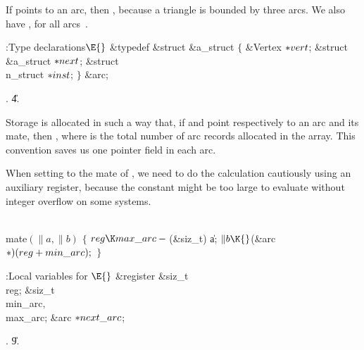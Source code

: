 \smallskip\noindent
If  points to an arc, then , because a triangle
is bounded by three arcs. We also have , for
all arcs~.

\Y\B\4:Type declarations\X${}\E{}$\6
\&{typedef} \&{struct} \&{a\_struct} ${}\{{}$\1\6
\&{Vertex} ${}{*}\\{vert}{}$;\6
\&{struct} \&{a\_struct} ${}{*}\\{next}{}$;\6
\&{struct} \\{n\_struct} ${}{*}\\{inst}{}$;\2\6
${}\}{}$ \&{arc};\par
{}.
\U4.\fi

Storage is allocated in such a way that, if  and  point
respectively
to an arc and its mate, then , where  is
the total number of arc records allocated in the  array.
This
convention saves us one pointer field in each arc.

When setting  to the mate of , we need to do the calculation
cautiously using an auxiliary register, because the constant
 might be too
large to evaluate without
integer overflow on some systems.

\Y\B\4\D\\{mate}$(\|a,\|b)$\6
${}\{{}$\1\6
${}\\{reg}\K\\{max\_arc}-{}$(\&{siz\_t}) \|a;\6
${}\|b\K{}$(\&{arc} ${}{*})(\\{reg}+\\{min\_arc});{}$\6
\4${}\}{}$\2\par
\Y\B\4:Local variables for \X${}\E{}$\6
\&{register} \&{siz\_t} \\{reg};\6
\&{siz\_t} \\{min\_arc}${},{}$ \\{max\_arc};\6
\&{arc} ${}{*}\\{next\_arc}{}$;\par
{}.
\U9.\fi

